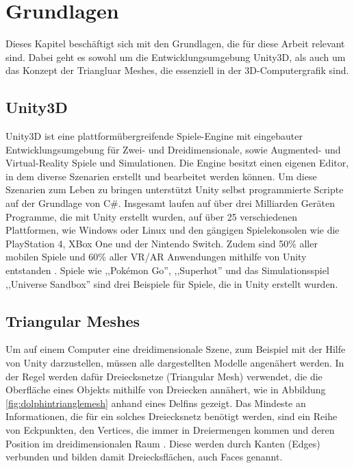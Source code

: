 \section{Grundlagen}
Dieses Kapitel besch\"aftigt sich mit den Grundlagen, die f\"ur diese Arbeit relevant sind. Dabei geht es sowohl um die Entwicklungsumgebung Unity3D, als auch um das Konzept der Triangluar Meshes, die essenziell in der 3D-Computergrafik sind.

\subsection{Unity3D}
Unity3D ist eine plattform\"ubergreifende Spiele-Engine mit eingebauter Entwicklungsumgebung f\"ur Zwei- und Dreidimensionale, sowie Augmented- und Virtual-Reality Spiele und Simulationen. Die Engine besitzt einen eigenen Editor, in dem diverse Szenarien erstellt und bearbeitet werden k\"onnen. Um diese Szenarien zum Leben zu bringen unterst\"utzt Unity selbst programmierte Scripte auf der Grundlage von C\#. Insgesamt laufen auf \"uber drei Milliarden Ger\"aten Programme, die mit Unity erstellt wurden, auf \"uber 25 verschiedenen Plattformen, wie Windows oder Linux und den g\"angigen Spielekonsolen wie die PlayStation 4, XBox One und der Nintendo Switch. Zudem sind 50\% aller mobilen Spiele und 60\% aller VR/AR Anwendungen mithilfe von Unity entstanden \cite{Unity}. Spiele wie ,,Pok\'emon Go'', ,,Superhot'' und das Simulationsspiel ,,Universe Sandbox'' sind drei Beispiele f\"ur Spiele, die in Unity erstellt wurden.

\subsection{Triangular Meshes}
Um auf einem Computer eine dreidimensionale Szene, zum Beispiel mit der Hilfe von Unity darzustellen, m\"ussen alle dargestellten Modelle angen\"ahert werden. In der Regel werden daf\"ur Dreiecksnetze (Triangular Mesh) verwendet, die die Oberfl\"ache eines Objekts mithilfe von Dreiecken ann\"ahert, wie in Abbildung \ref{fig:dolphintrianglemesh} anhand eines Delfins gezeigt. Das Mindeste an Informationen, die f\"ur ein solches Dreiecksnetz ben\"otigt werden, sind ein Reihe von Eckpunkten, den Vertices, die immer in Dreiermengen kommen und deren Position im dreidimensionalen Raum \cite[S.262]{Shirley2010}. Diese werden durch Kanten (Edges) verbunden und bilden damit Dreiecksfl\"achen, auch Faces genannt.

